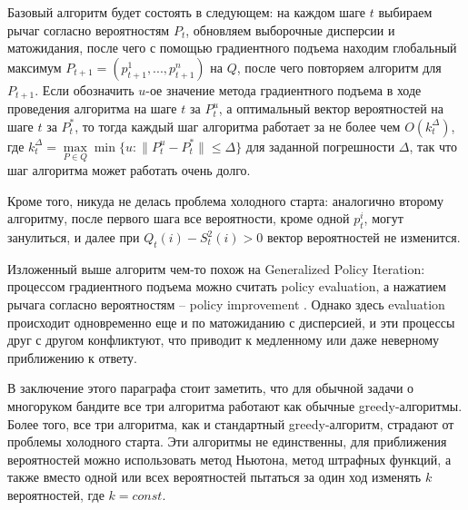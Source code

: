     Базовый алгоритм будет состоять в следующем: на каждом шаге $t$ выбираем рычаг согласно вероятностям $P_t$, обновляем выборочные дисперсии и матожидания, после чего с помощью градиентного подъема находим глобальный максимум $P_{t+1} = (p_{t+1}^1, ..., p_{t+1}^n)$ на $Q$, после чего повторяем алгоритм для $P_{t+1}$. Если обозначить $u$-ое значение метода градиентного подъема в ходе проведения алгоритма на шаге $t$ за $P_t^u$, а оптимальный вектор вероятностей на шаге $t$ за $P_t^*$, то тогда каждый шаг алгоритма работает за не более чем $O(k_t^{\Delta})$, где $k_t^{\Delta} = \underset{P \in Q}{\max} \min \{u: \| P_t^u - P_t^* \| \leq \Delta\}$ для заданной погрешности $\Delta$, так что шаг алгоритма может работать очень долго.

    Кроме того, никуда не делась проблема холодного старта: аналогично второму алгоритму, после первого шага все вероятности, кроме одной $p_t^i$, могут занулиться, и далее при $Q_t(i) - S_t^2(i) > 0$ вектор вероятностей не изменится.

    Изложенный выше алгоритм чем-то похож на Generalized Policy Iteration: процессом градиентного подъема можно считать policy evaluation, а нажатием рычага согласно вероятностям -- policy improvement \cite{suttonbarto_policy_iteration}. Однако здесь evaluation происходит одновременно еще и по матожиданию с дисперсией, и эти процессы друг с другом конфликтуют, что приводит к медленному или даже неверному приближению к ответу.

В заключение этого параграфа стоит заметить, что для обычной задачи о многоруком бандите все три алгоритма работают как обычные greedy-алгоритмы. Более того, все три алгоритма, как и стандартный greedy-алгоритм, страдают от проблемы холодного старта. Эти алгоритмы не единственны, для приближения вероятностей можно использовать метод Ньютона, метод штрафных функций, а также вместо одной или всех вероятностей пытаться за один ход изменять $k$ вероятностей, где $k = const$.

